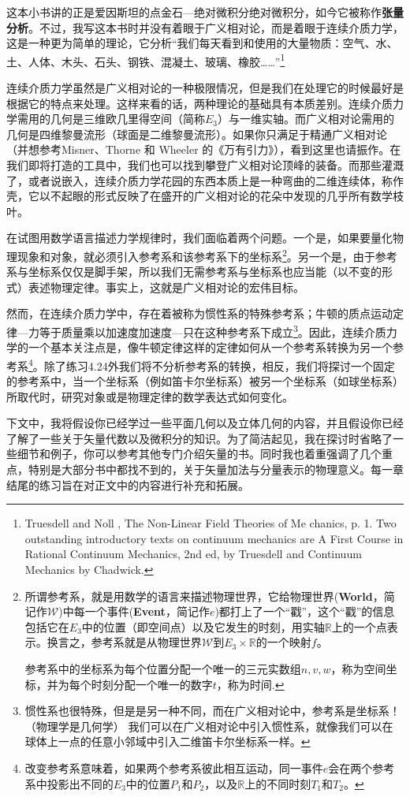 

这本小书讲的正是爱因斯坦的点金石---绝对微积分绝对微积分，如今它被称作\textbf{张量分析}。不过，我写这本书时并没有着眼于广义相对论，而是着眼于连续介质力学，这是一种更为简单的理论，它分析“我们每天看到和使用的大量物质：空气、水、土、人体、木头、石头、钢铁、混凝土、玻璃、橡胶……”\footnote{Truesdell and Noll , The Non-Linear Field Theories of Me chanics, p. 1. Two outstanding introductory texts on continuum mechanics are A First Course in Rational Continuum Mechanics, 2nd ed, by Truesdell and Continuum Mechanics by Chadwick.}

连续介质力学虽然是广义相对论的一种极限情况，但是我们在处理它的时候最好是根据它的特点来处理。这样来看的话，两种理论的基础具有本质差别。连续介质力学需用的几何是三维欧几里得空间（简称$E_3$）与一维实轴。而广义相对论需用的几何是四维黎曼流形（球面是二维黎曼流形）。如果你只满足于精通广义相对论（并想参考Misner、Thorne 和 Wheeler 的《万有引力》），看到这里也请振作。在我们即将打造的工具中，我们也可以找到攀登广义相对论顶峰的装备。而那些灌溉了，或者说嵌入，连续介质力学花园的东西本质上是一种弯曲的二维连续体，称作壳，它以不起眼的形式反映了在盛开的广义相对论的花朵中发现的几乎所有数学枝叶。

在试图用数学语言描述力学规律时，我们面临着两个问题。一个是，如果要量化物理现象和对象，就必须引入参考系和该参考系下的坐标系\footnote{所谓参考系，就是用数学的语言来描述物理世界，它给物理世界(\textbf{World}，简记作$\mathscr{W} $)中每一个事件(\textbf{Event}，简记作$e$)都打上了一个“戳”，这个“戳”的信息包括它在$E_3$中的位置（即空间点）以及它发生的时刻，用实轴$\mathbb{R} $上的一个点表示。换言之，参考系就是从物理世界$\mathscr{W} $到$E_3\times \mathbb{R} $的一个映射$f$。

参考系中的坐标系为每个位置分配一个唯一的三元实数组$n,v,w$，称为空间坐标，并为每个时刻分配一个唯一的数字$t$，称为时间.}。另一个是，由于参考系与坐标系仅仅是脚手架，所以我们无需参考系与坐标系也应当能（以不变的形式）表述物理定律。事实上，这就是广义相对论的宏伟目标。

然而，在连续介质力学中，存在着被称为惯性系的特殊参考系；牛顿的质点运动定律---力等于质量乘以加速度加速度---只在这种参考系下成立\footnote{惯性系也很特殊，但是是另一种不同，而在广义相对论中，参考系是坐标系！ （物理学是几何学） 我们可以在广义相对论中引入惯性系，就像我们可以在球体上一点的任意小邻域中引入二维笛卡尔坐标系一样。}。因此，连续介质力学的一个基本关注点是，像牛顿定律这样的定律如何从一个参考系转换为另一个参考系\footnote{改变参考系意味着，如果两个参考系彼此相互运动，同一事件$e$会在两个参考系中投影出不同的$E_3$中的位置$P_1$和$P_2$，以及$\mathbb{R}$上的不同时刻$T_1$和$T_2$。}。除了练习4.24外我们将不分析参考系的转换，相反，我们将探讨一个固定的参考系中，当一个坐标系（例如笛卡尔坐标系）被另一个坐标系（如球坐标系）所取代时，研究对象或是物理定律的数学表达式如何变化。

下文中，我将假设你已经学过一些平面几何以及立体几何的内容，并且假设你已经了解了一些关于矢量代数以及微积分的知识。为了简洁起见，我在探讨时省略了一些细节和例子，你可以参考其他专门介绍矢量的书。同时我也着重强调了几个重点，特别是大部分书中都找不到的，关于矢量加法与分量表示的物理意义。每一章结尾的练习旨在对正文中的内容进行补充和拓展。





